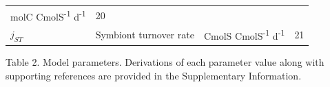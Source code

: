 \documentclass[]{elsarticle} %
\begin{document}
\begin{longtable}[c]{@{}llll@{}}
\begin{minipage}[t]{0.25\columnwidth}\raggedright\strut
molC CmolS\textsuperscript{-1} d\textsuperscript{-1}
\strut\end{minipage} &
\begin{minipage}[t]{0.10\columnwidth}\raggedright\strut
20
\strut\end{minipage}\tabularnewline
\begin{minipage}[t]{0.10\columnwidth}\raggedright\strut
\(j_{ST}\)
\strut\end{minipage} &
\begin{minipage}[t]{0.48\columnwidth}\raggedright\strut
Symbiont turnover rate
\strut\end{minipage} &
\begin{minipage}[t]{0.25\columnwidth}\raggedright\strut
CmolS CmolS\textsuperscript{-1} d\textsuperscript{-1}
\strut\end{minipage} &
\begin{minipage}[t]{0.10\columnwidth}\raggedright\strut
21
\strut\end{minipage}\tabularnewline
\bottomrule
\end{longtable}

Table 2. Model parameters. Derivations of each parameter value along
with supporting references are provided in the Supplementary
Information.
\end{document}
